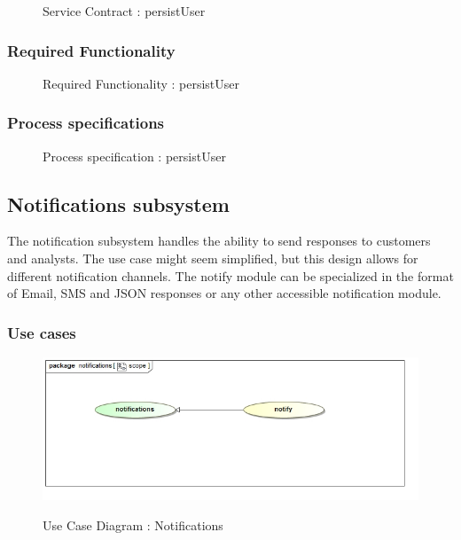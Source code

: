 \documentclass{article}
\begin{document}
		\begin{figure}[H]
		\caption{Service Contract : persistUser}
		\end{figure}

		\subsubsection{Required Functionality}

		\begin{figure}[H]
		\caption{Required Functionality : persistUser}
		\end{figure}

		\subsubsection{Process specifications}

		\begin{figure}[H]
		\caption{Process specification : persistUser}
		\end{figure}

	\pagebreak
	\subsection{Notifications subsystem}\label{subsec:Notifcations}
	The notification subsystem handles the ability to send responses to customers and analysts. The use case might seem simplified, but this design allows for different notification channels. The notify module can be specialized in the format of Email, SMS and JSON responses or any other accessible notification module.
		\subsubsection{Use cases}

		\begin{figure}[H]
		\includegraphics[width=\textwidth]{images/uc__notifications__scope.jpg}  \\
		\caption{Use Case Diagram : Notifications}
		\end{figure}
\end{document}

